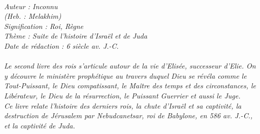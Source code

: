 \BFont
\noindent\hrulefill
{\footnotesize
\textit{
\bigskip
{\centering{}
\\Auteur : Inconnu
\\(Heb. : Melakhim)
\\Signification : Roi, Règne
\\Thème : Suite de l'histoire d'Israël et de Juda
\\Date de rédaction : 6 siècle av. J.-C.\\}
}
\textit{
\\Le second livre des rois s'articule autour de la vie d'Elisée, successeur d'Elie. On y découvre le ministère prophétique au travers duquel Dieu se révéla comme le Tout-Puissant, le Dieu compatissant, le Maître des temps et des circonstances, le Libérateur, le Dieu de la résurrection, le Puissant Guerrier et aussi le Juge.
\\Ce livre relate l'histoire des derniers rois, la chute d'Israël et sa captivité, la destruction de Jérusalem par Nebudcanetsar, roi de Babylone, en 586 av. J.-C., et la captivité de Juda.\bigskip
}
}
\par\nobreak\noindent\hrulefill
